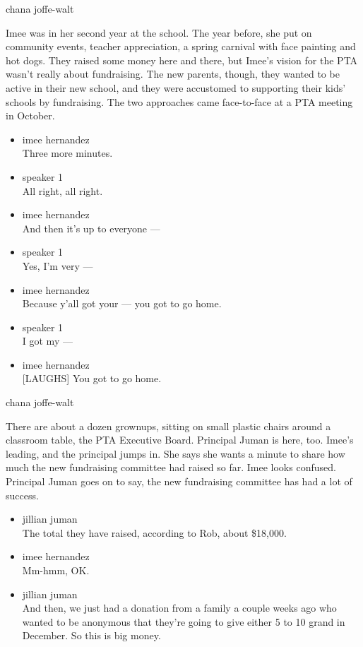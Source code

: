 chana joffe-walt

Imee was in her second year at the school. The year before, she put on
community events, teacher appreciation, a spring carnival with face
painting and hot dogs. They raised some money here and there, but Imee's
vision for the PTA wasn't really about fundraising. The new parents,
though, they wanted to be active in their new school, and they were
accustomed to supporting their kids' schools by fundraising. The two
approaches came face-to-face at a PTA meeting in October.

\begin{itemize}
\item
  imee hernandez\\
  Three more minutes.
\item
  speaker 1\\
  All right, all right.
\item
  imee hernandez\\
  And then it's up to everyone ---
\item
  speaker 1\\
  Yes, I'm very ---
\item
  imee hernandez\\
  Because y'all got your --- you got to go home.
\item
  speaker 1\\
  I got my ---
\item
  imee hernandez\\
  {[}LAUGHS{]} You got to go home.
\end{itemize}

chana joffe-walt

There are about a dozen grownups, sitting on small plastic chairs around
a classroom table, the PTA Executive Board. Principal Juman is here,
too. Imee's leading, and the principal jumps in. She says she wants a
minute to share how much the new fundraising committee had raised so
far. Imee looks confused. Principal Juman goes on to say, the new
fundraising committee has had a lot of success.

\begin{itemize}
\item
  jillian juman\\
  The total they have raised, according to Rob, about \$18,000.
\item
  imee hernandez\\
  Mm-hmm, OK.
\item
  jillian juman\\
  And then, we just had a donation from a family a couple weeks ago who
  wanted to be anonymous that they're going to give either 5 to 10 grand
  in December. So this is big money.
\end{itemize}

